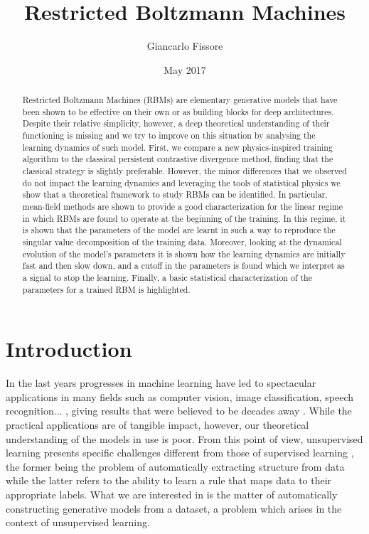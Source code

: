 \documentclass{revtex4-1}
\begin{document}
\title{Restricted Boltzmann Machines}
\author{Giancarlo Fissore}
\date{May 2017}

\begin{abstract}
Restricted Boltzmann Machines (RBMs) are elementary generative models that have been shown to be effective on their own or as building blocks for deep architectures. Despite their relative simplicity, however, a deep theoretical understanding of their functioning is missing and we try to improve on this situation by analysing the learning dynamics of such model. First, we compare a new physics-inspired training algorithm to the classical persistent contrastive divergence method, finding that the classical strategy is slightly preferable. However, the minor differences that we observed do not impact the learning dynamics and leveraging the tools of statistical physics we show that a theoretical framework to study RBMs can be identified. In particular, mean-field methods are shown to provide a good characterization for the linear regime in which RBMs are found to operate at the beginning of the training. In this regime, it is shown that the parameters of the model are learnt in such a way to reproduce the singular value decomposition of the training data. Moreover, looking at the dynamical evolution of the model's parameters it is shown how the learning dynamics are initially fast and then slow down, and a cutoff in the parameters is found which we interpret as a signal to stop the learning. Finally, a basic statistical characterization of the parameters for a trained RBM is highlighted.
\end{abstract}

\maketitle

\section{Introduction}
In the last years progresses in machine learning have led to spectacular applications in many fields such as computer vision, image classification, speech recognition... \cite{}\cite{}, giving results that were believed to be decades away \cite{}. While the practical applications are of tangible impact, however, our theoretical understanding of the models in use is poor. From this point of view, unsupervised learning presents specific challenges different from those of supervised learning \cite{foundations}, the former being the problem of automatically extracting structure from data while the latter refers to the ability to learn a rule that maps data to their appropriate labels. What we are interested in is the matter of automatically constructing generative models from a dataset, a problem which arises in the context of unsupervised learning.
\end{document}
